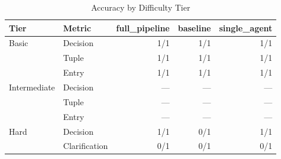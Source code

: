 \begin{table}[htbp]
\centering
\caption{Accuracy by Difficulty Tier}
\label{tab:tier-breakdown}
\begin{tabular}{ll rrr}
\toprule
Tier & Metric & full\_pipeline & baseline & single\_agent \\
\midrule
  Basic & Decision & 1/1 & 1/1 & 1/1 \\
   & Tuple & 1/1 & 1/1 & 1/1 \\
   & Entry & 1/1 & 1/1 & 1/1 \\
  \midrule
  Intermediate & Decision & --- & --- & --- \\
   & Tuple & --- & --- & --- \\
   & Entry & --- & --- & --- \\
  \midrule
  Hard & Decision & 1/1 & 0/1 & 1/1 \\
   & Clarification & 0/1 & 0/1 & 0/1 \\
\bottomrule
\end{tabular}
\end{table}
